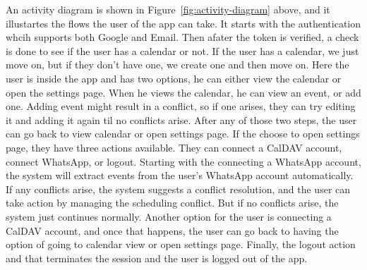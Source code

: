 An activity diagram is shown in Figure~\ref{fig:activity-diagram} above, and it illustartes the flows the user of the app can take. It starts with the authentication whcih supports both Google and Email. Then afater the token is verified, a check is done to see if the user has a calendar or not. If the user has a calendar, we just move on, but if they don't have one, we create one and then move on. Here the user is inside the app and has two options, he can either view the calendar or open the settings page. When he views the calendar, he can view an event, or add one. Adding event might result in a conflict, so if one arises, they can try editing it and adding it again til no conflicts arise. After any of those two steps, the user can go back to view calendar or open settings page. If the choose to open settings page, they have three actions available. They can connect a CalDAV account, connect WhatsApp, or logout. Starting with the connecting a WhatsApp account, the system will extract events from the user's WhatsApp account automatically. If any conflicts arise, the system suggests a conflict resolution, and the user can take action by managing the scheduling conflict. But if no conflicts arise, the system just continues normally. Another option for the user is connecting a CalDAV account, and once that happens, the user can go back to having the option of going to calendar view or open settings page. Finally, the logout action and that terminates the session and the user is logged out of the app.


